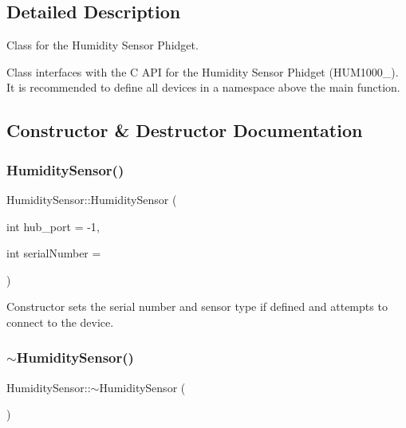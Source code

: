 \subsection{Detailed Description}
Class for the Humidity Sensor Phidget. 

Class interfaces with the C A\+PI for the Humidity Sensor Phidget (H\+U\+M1000\+\_). It is recommended to define all devices in a namespace above the main function. 

\subsection{Constructor \& Destructor Documentation}
\mbox{\label{classHumiditySensor_a5e199091caca19235543cd9e55493566}} 
\subsubsection{\texorpdfstring{Humidity\+Sensor()}{HumiditySensor()}}
{\footnotesize\ttfamily Humidity\+Sensor\+::\+Humidity\+Sensor (\begin{DoxyParamCaption}\item[{int}]{hub\+\_\+port = {\ttfamily -\/1},  }\item[{int}]{serial\+Number = {} }\end{DoxyParamCaption})\hspace{0.3cm}{\ttfamily [inline]}}

Constructor sets the serial number and sensor type if defined and attempts to connect to the device.\mbox{\label{classHumiditySensor_a7c176f946d95e90b4f9aabbdbbd90874}} 
\subsubsection{\texorpdfstring{$\sim$\+Humidity\+Sensor()}{~HumiditySensor()}}
{\footnotesize\ttfamily Humidity\+Sensor\+::$\sim$\+Humidity\+Sensor (\begin{DoxyParamCaption}{ }\end{DoxyParamCaption})\hspace{0.3cm}{\ttfamily [inline]}}

